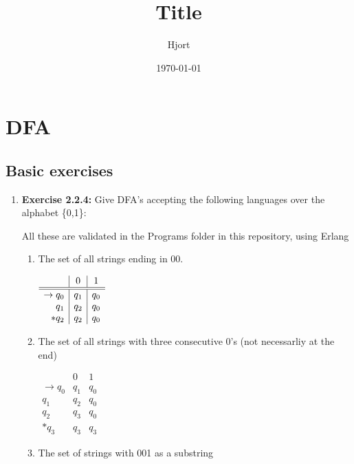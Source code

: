 \documentclass{article}
\title{Title}
\date{\today}
\author{Hjort}
\begin{document}
\maketitle

\section*{DFA}
\subsection*{Basic exercises}

\begin{enumerate}
    \item \textbf{Exercise 2.2.4:} Give DFA's accepting the following languages over the alphabet \{0,1\}:

        All these are validated in the Programs folder in this repository, using Erlang

        \begin{enumerate}
            \item The set of all strings ending in $00$.

                $
                \begin{array}{r | c | c}
                        & 0 & 1 \\ \hline \hline
                    \to q_0 & q_1 & q_0 \\
                        q_1 & q_2 & q_0\\
                        *q_2 & q_2 & q_0
                \end{array}
                $

            \item The set of all strings with three consecutive 0's (not necessarliy at the end)

                $ \begin{array}{r|c|c}
                            & 0 & 1 \\ \hline \hline
                    \to q_0 & q_1 & q_0 \\
                    q_1 & q_2 & q_0 \\
                    q_2 & q_3 & q_0 \\
                    *q_3 & q_3 & q_3
                \end{array}
                $

            \item The set of strings with 001 as a substring


\end{enumerate}
\end{enumerate}
\end{document}
